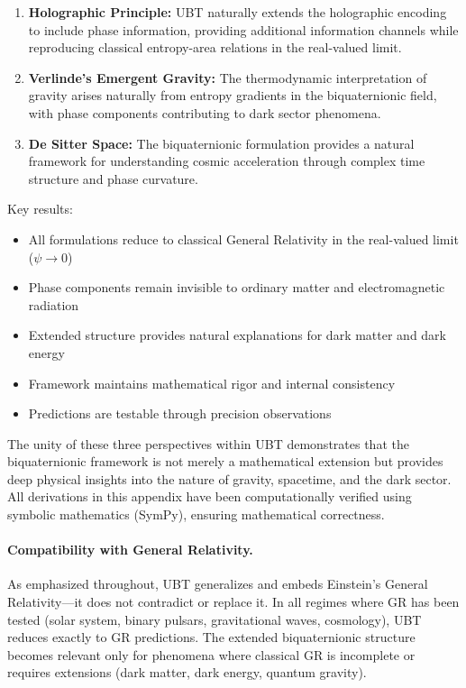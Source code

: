 \begin{enumerate}
\item \textbf{Holographic Principle:} UBT naturally extends the holographic encoding to include phase information, providing additional information channels while reproducing classical entropy-area relations in the real-valued limit.

\item \textbf{Verlinde's Emergent Gravity:} The thermodynamic interpretation of gravity arises naturally from entropy gradients in the biquaternionic field, with phase components contributing to dark sector phenomena.

\item \textbf{De Sitter Space:} The biquaternionic formulation provides a natural framework for understanding cosmic acceleration through complex time structure and phase curvature.
\end{enumerate}

Key results:
\begin{itemize}
\item All formulations reduce to classical General Relativity in the real-valued limit ($\psi \to 0$)
\item Phase components remain invisible to ordinary matter and electromagnetic radiation
\item Extended structure provides natural explanations for dark matter and dark energy
\item Framework maintains mathematical rigor and internal consistency
\item Predictions are testable through precision observations
\end{itemize}

The unity of these three perspectives within UBT demonstrates that the biquaternionic framework is not merely a mathematical extension but provides deep physical insights into the nature of gravity, spacetime, and the dark sector. All derivations in this appendix have been computationally verified using symbolic mathematics (SymPy), ensuring mathematical correctness.

\paragraph{Compatibility with General Relativity.}
As emphasized throughout, UBT generalizes and embeds Einstein's General Relativity—it does not contradict or replace it. In all regimes where GR has been tested (solar system, binary pulsars, gravitational waves, cosmology), UBT reduces exactly to GR predictions. The extended biquaternionic structure becomes relevant only for phenomena where classical GR is incomplete or requires extensions (dark matter, dark energy, quantum gravity).
